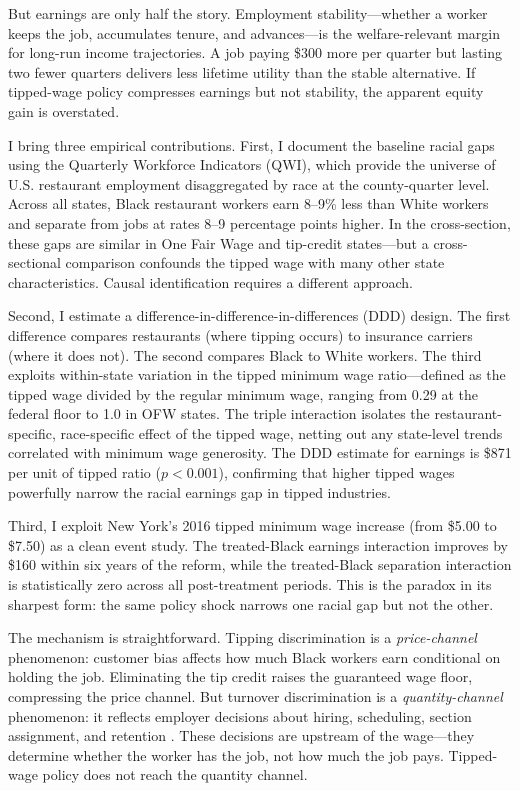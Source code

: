 \documentclass[12pt]{article}
\begin{document}
But earnings are only half the story. Employment stability---whether a worker keeps the job, accumulates tenure, and advances---is the welfare-relevant margin for long-run income trajectories. A job paying \$300 more per quarter but lasting two fewer quarters delivers less lifetime utility than the stable alternative. If tipped-wage policy compresses earnings but not stability, the apparent equity gain is overstated.

I bring three empirical contributions. First, I document the baseline racial gaps using the Quarterly Workforce Indicators (QWI), which provide the universe of U.S. restaurant employment disaggregated by race at the county-quarter level. Across all states, Black restaurant workers earn 8--9\% less than White workers and separate from jobs at rates 8--9 percentage points higher. In the cross-section, these gaps are similar in One Fair Wage and tip-credit states---but a cross-sectional comparison confounds the tipped wage with many other state characteristics. Causal identification requires a different approach.

Second, I estimate a difference-in-difference-in-differences (DDD) design. The first difference compares restaurants (where tipping occurs) to insurance carriers (where it does not). The second compares Black to White workers. The third exploits within-state variation in the tipped minimum wage ratio---defined as the tipped wage divided by the regular minimum wage, ranging from 0.29 at the federal floor to 1.0 in OFW states. The triple interaction isolates the restaurant-specific, race-specific effect of the tipped wage, netting out any state-level trends correlated with minimum wage generosity. The DDD estimate for earnings is \$871 per unit of tipped ratio ($p < 0.001$), confirming that higher tipped wages powerfully narrow the racial earnings gap in tipped industries.

Third, I exploit New York's 2016 tipped minimum wage increase (from \$5.00 to \$7.50) as a clean event study. The treated-Black earnings interaction improves by \$160 within six years of the reform, while the treated-Black separation interaction is statistically zero across all post-treatment periods. This is the paradox in its sharpest form: the same policy shock narrows one racial gap but not the other.

The mechanism is straightforward. Tipping discrimination is a \textit{price-channel} phenomenon: customer bias affects how much Black workers earn conditional on holding the job. Eliminating the tip credit raises the guaranteed wage floor, compressing the price channel. But turnover discrimination is a \textit{quantity-channel} phenomenon: it reflects employer decisions about hiring, scheduling, section assignment, and retention \citep{pager2009discrimination, bertrand2004emily}. These decisions are upstream of the wage---they determine whether the worker has the job, not how much the job pays. Tipped-wage policy does not reach the quantity channel.
\end{document}

